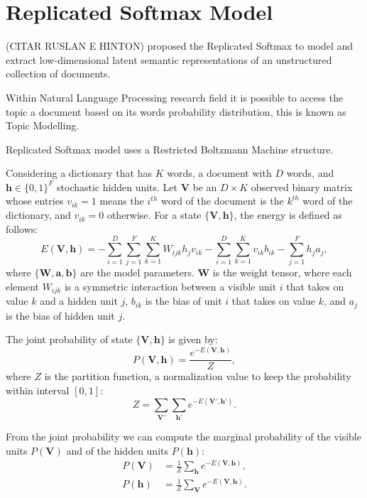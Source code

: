 \section{Replicated Softmax Model}%
\label{app:rsm}%

(CITAR RUSLAN E HINTON) proposed the Replicated Softmax to model and extract low-dimensional latent semantic representations of an unstructured collection of documents.

Within Natural Language Processing research field it is possible to access the topic a document based on its words probability distribution, this is known as Topic Modelling.

Replicated Softmax model uses a Restricted Boltzmann Machine structure.

Considering a dictionary that has $K$ words, a document with $D$ words, and $\mathbf{h} \in \{0, 1\}^{F}$ stochastic hidden units. Let $\mathbf{V}$ be an $D \times K$ observed binary matrix whose entries $v_{ik} = 1$ means the $i^{th}$ word of the document is the $k^{th}$ word of the dictionary, and $v_{ik} = 0$ otherwise.
For a state $\{\mathbf{V}, \mathbf{h}\}$, the energy is defined as follows:
\begin{equation}
    \label{eq:app:rsm-energy-Vh}
    E(\mathbf{V}, \mathbf{h}) = - \sum^{D}_{i = 1} \sum^{F}_{j = 1} \sum^{K}_{k = 1} W_{ijk} h_{j} v_{ik} - \sum^{D}_{i = 1} \sum^{K}_{k = 1} v_{ik} b_{ik} - \sum^{F}_{j = 1} h_{j} a_{j},
\end{equation}
where $\{\mathbf{W}, \mathbf{a}, \mathbf{b}\}$ are the model parameters.
$\mathbf{W}$ is the weight tensor, where each element $W_{ijk}$ is a symmetric interaction between a visible unit $i$ that takes on value $k$ and a hidden unit $j$, $b_{ik}$ is the bias of unit $i$ that takes on value $k$, and $a_{j}$ is the bias of hidden unit $j$.

The joint probability of state $\{\mathbf{V}, \mathbf{h}\}$ is given by:
\begin{equation}
    \label{eq:app:rsm-joint-prob}
    P(\mathbf{V}, \mathbf{h}) = \frac{e^{-E(\mathbf{V}, \mathbf{h})}}{Z},
\end{equation}
where $Z$ is the partition function, a normalization value to keep the probability within interval $[0, 1]$:
\begin{equation}
    \label{eq:app:rsm-partition-func}
    Z = \sum_{\mathbf{V}'} \sum_{\mathbf{h}'} e^{-E(\mathbf{V}', \mathbf{h}')}.
\end{equation}

From the joint probability we can compute the marginal probability of the visible units $P(\mathbf{V})$ and of the hidden units $P(\mathbf{h})$:
\begin{align}
    \label{eq:app:rsm-marg-prob-visible}
    P(\mathbf{V}) &= \frac{1}{Z} \sum_{\mathbf{h}} e^{-E(\mathbf{V}, \mathbf{h})}, \\
    P(\mathbf{h}) &= \frac{1}{Z} \sum_{\mathbf{V}} e^{-E(\mathbf{V}, \mathbf{h})}.
\end{align}
